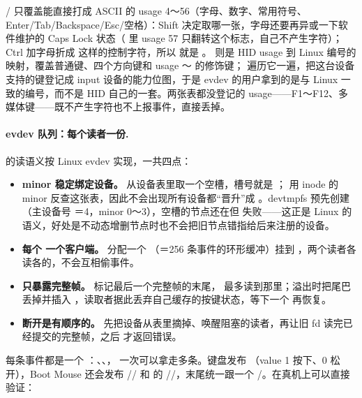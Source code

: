 / 只覆盖能直接打成 ASCII 的 usage 4～56（字母、数字、常用符号、Enter/Tab/Backspace/Esc/空格）：Shift 决定取哪一张，字母还要再异或一下软件维护的 Caps Lock 状态（ 里 usage 57 只翻转这个标志，自己不产生字符）；Ctrl 加字母折成  这样的控制字符，所以  就是 。 则是 HID usage 到 Linux  编号的映射，覆盖普通键、四个方向键和 usage ～ 的修饰键； 遍历它一遍，把这台设备支持的键登记成 input 设备的能力位图，于是 evdev 的用户拿到的是与 Linux 一致的编号，而不是 HID 自己的一套。两张表都没登记的 usage——F1～F12、多媒体键——既不产生字符也不上报事件，直接丢掉。

\paragraph{evdev 队列：每个读者一份.}  的读语义按 Linux evdev 实现，一共四点：

\begin{itemize}
  \item \textbf{minor 稳定绑定设备。} 从设备表里取一个空槽，槽号就是 ； 用 inode 的 minor 反查这张表，因此不会出现所有设备都“晋升”成 。devtmpfs 预先创建 （主设备号 ＝4，minor 0～3），空槽的节点还在但  失败——这正是 Linux 的  语义，好处是不动态增删节点时也不会把旧节点错指给后来注册的设备。
  \item \textbf{每个  一个客户端。} 分配一个 （＝256 条事件的环形缓冲）挂到 ，两个读者各读各的，不会互相偷事件。
  \item \textbf{只暴露完整帧。} 标记最后一个完整帧的末尾， 最多读到那里；溢出时把尾巴丢掉并插入 ，读取者据此丢弃自己缓存的按键状态，等下一个  再恢复。
  \item \textbf{断开是有顺序的。} 先把设备从表里摘掉、唤醒阻塞的读者，再让旧 fd 读完已经提交的完整帧，之后  才返回错误。
\end{itemize}

每条事件都是一个 ：、、， 一次可以拿走多条。键盘发布 （value 1 按下、0 松开），Boot Mouse 还会发布 // 和  的 //，末尾统一跟一个 /。在真机上可以直接验证：

